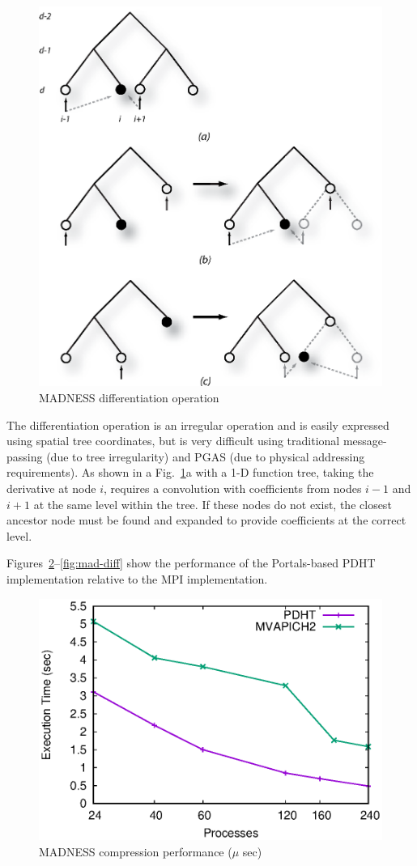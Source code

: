 \begin{figure}[ht]
  \center
  \includegraphics[width=.75\linewidth]{figs/diff}
  \caption{MADNESS differentiation operation}
  \label{fig:diff}
\end{figure}


The differentiation operation is an irregular operation and is easily expressed
using spatial tree coordinates, but is very difficult using traditional
message-passing (due to tree irregularity) and PGAS (due to physical addressing
requirements). As shown in a Fig.~\ref{fig:diff}a with a 1-D function tree,
taking the derivative at node $i$, requires a convolution with coefficients
from nodes $i-1$ and $i+1$ at the same level within the tree. If these nodes
do not exist, the closest ancestor node must be found and expanded to provide
coefficients at the correct level. 


Figures~\ref{fig:mad-compress}--\ref{fig:mad-diff} show the performance of the
Portals-based PDHT implementation relative to the MPI implementation.

\begin{figure}[ht]
  \center
  \includegraphics[width=.9\linewidth]{plots/compress}
  \caption{MADNESS compression performance ($\mu$ sec)}
  \label{fig:mad-compress}
\end{figure}

